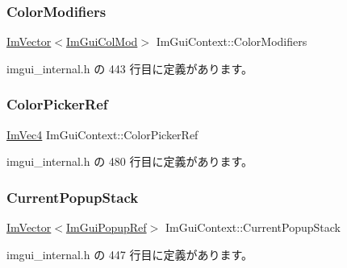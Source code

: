 \subsubsection{\texorpdfstring{Color\+Modifiers}{ColorModifiers}}
{\footnotesize\ttfamily \mbox{\hyperlink{class_im_vector}{Im\+Vector}}$<$\mbox{\hyperlink{struct_im_gui_col_mod}{Im\+Gui\+Col\+Mod}}$>$ Im\+Gui\+Context\+::\+Color\+Modifiers}



 imgui\+\_\+internal.\+h の 443 行目に定義があります。

\mbox{\label{struct_im_gui_context_ae3a119a9a71b31ede7ccc87447627b68}} 
\subsubsection{\texorpdfstring{Color\+Picker\+Ref}{ColorPickerRef}}
{\footnotesize\ttfamily \mbox{\hyperlink{struct_im_vec4}{Im\+Vec4}} Im\+Gui\+Context\+::\+Color\+Picker\+Ref}



 imgui\+\_\+internal.\+h の 480 行目に定義があります。

\mbox{\label{struct_im_gui_context_a7b2472ca52bcccb98e0db1a8b1b78853}} 
\subsubsection{\texorpdfstring{Current\+Popup\+Stack}{CurrentPopupStack}}
{\footnotesize\ttfamily \mbox{\hyperlink{class_im_vector}{Im\+Vector}}$<$\mbox{\hyperlink{struct_im_gui_popup_ref}{Im\+Gui\+Popup\+Ref}}$>$ Im\+Gui\+Context\+::\+Current\+Popup\+Stack}



 imgui\+\_\+internal.\+h の 447 行目に定義があります。

\mbox{\label{struct_im_gui_context_aa923044f396241668aef5ed2f4c4d847}} 
